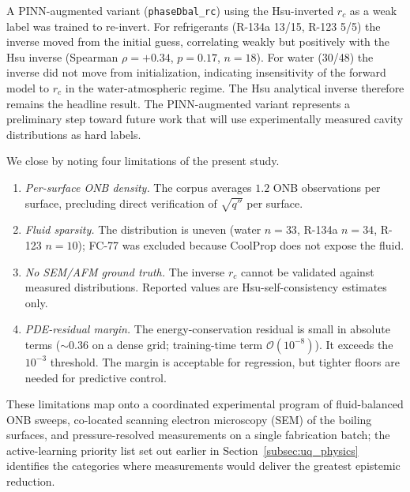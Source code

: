 A PINN-augmented variant (\texttt{phaseDbal\_rc}) using the
Hsu-inverted $r_c$ as a weak label was trained to re-invert. For
refrigerants (R-134a 13/15, R-123 5/5) the inverse moved from the
initial guess, correlating weakly but positively with the Hsu
inverse (Spearman $\rho=+0.34$, $p=0.17$, $n=18$). For water
(30/48) the inverse did not move from initialization, indicating
insensitivity of the forward model to $r_c$ in the
water-atmospheric regime. The Hsu analytical inverse therefore
remains the headline result. The PINN-augmented variant represents
a preliminary step toward future work that will use experimentally
measured cavity distributions as hard labels.

We close by noting four limitations of the present study.

\begin{enumerate}
  \item \textit{Per-surface ONB density.} The corpus averages $1.2$ ONB
    observations per surface, precluding direct verification of
    $\sqrt{q''}$ per surface.
  \item \textit{Fluid sparsity.} The distribution is uneven (water $n=33$,
    R-134a $n=34$, R-123 $n=10$); FC-77 was excluded because CoolProp
    does not expose the fluid.
  \item \textit{No SEM/AFM ground truth.} The inverse $r_c$ cannot be
    validated against measured distributions. Reported values are
    Hsu-self-consistency estimates only.
  \item \textit{PDE-residual margin.} The energy-conservation
    residual is small in absolute terms ($\sim 0.36$ on a dense grid;
    training-time term $\mathcal{O}(10^{-8})$). It exceeds the
    $10^{-3}$ threshold. The margin is acceptable for regression, but
    tighter floors are needed for predictive control.
\end{enumerate}

These limitations map onto a coordinated experimental program of
fluid-balanced ONB sweeps, co-located scanning electron microscopy
(SEM) of the boiling surfaces, and pressure-resolved measurements on
a single fabrication batch; the active-learning priority list set
out earlier in Section~\ref{subsec:uq_physics} identifies the
categories where measurements would deliver the greatest epistemic
reduction.


